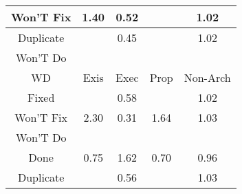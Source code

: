 \begin{tabular}{|c||c|c|c|c|}
\hline
Won'T Fix & \cellcolor[rgb]{0.818035037855012,0.7964376495102687,0.42} 1.40 & \cellcolor[rgb]{0.8199891471976563,0.41394863006890614,0.3359898707178125} 0.52 &  & \cellcolor[rgb]{0.9062453176479429,0.8382214662542886,0.42} 1.02 \\ 
\hline
Duplicate &  & \cellcolor[rgb]{0.8064903103019341,0.35005413542915453,0.32339095628180514} 0.45 &  & \cellcolor[rgb]{0.9054833224373159,0.8378605211545181,0.42} 1.02 \\ 
\hline
Won'T Do &  &  &  &  \\ 
\hline
\hline
WD & Exis & Exec & Prop & Non-Arch \\ 
\hline
Fixed &  & \cellcolor[rgb]{0.8320184318984102,0.47088724431914136,0.3472172031051828} 0.58 &  & \cellcolor[rgb]{0.904307938610833,0.8373037603946051,0.42} 1.02 \\ 
\hline
Won'T Fix & \cellcolor[rgb]{0.6127457762870652,0.6991953677149255,0.42} 2.30 & \cellcolor[rgb]{0.7811032206055393,0.229888577532886,0.2996963392318367} 0.31 & \cellcolor[rgb]{0.7630549436774579,0.7703944470051116,0.41999999999999993} 1.64 & \cellcolor[rgb]{0.9022448509053825,0.8363265083236022,0.42} 1.03 \\ 
\hline
Won'T Do &  &  &  &  \\ 
\hline
Done & \cellcolor[rgb]{0.8641431884930358,0.6229444255337028,0.37720030926016673} 0.75 & \cellcolor[rgb]{0.7683059603194979,0.7728817706776568,0.41999999999999993} 1.62 & \cellcolor[rgb]{0.8539889299309524,0.5748809350065085,0.367723001268889} 0.70 & \cellcolor[rgb]{0.9032834482850329,0.8082083218824891,0.41373121839936405} 0.96 \\ 
\hline
Duplicate &  & \cellcolor[rgb]{0.8282068626589749,0.45284581658581424,0.34365973848170983} 0.56 &  & \cellcolor[rgb]{0.903707668965918,0.8370194221417506,0.42} 1.03 \\ 
\hline
\end{tabular}